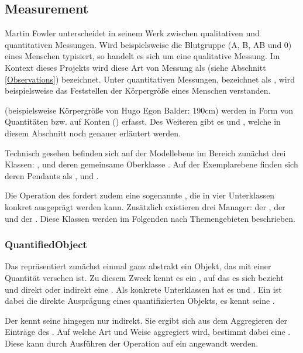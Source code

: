 \subsection{Measurement}
Martin Fowler unterscheidet in seinem Werk  zwischen qualitativen und quantitativen
Messungen. Wird beispielsweise die Blutgruppe (A, B, AB und 0) eines Menschen typisiert, so handelt es sich um
eine qualitative Messung. Im Kontext dieses Projekts wird diese Art von Messung als  (siehe Abschnitt
\ref{Observations}) bezeichnet. Unter quantitativen Messungen, bezeichnet als , wird
beispielsweise das Feststellen der Körpergröße eines Menschen verstanden.

 (beispielsweise Körpergröße von Hugo Egon Balder: 190cm) werden in Form von Quantitäten bzw.
 auf Konten () erfasst. Des Weiteren gibt es  und
, welche in diesem Abschnitt noch genauer erläutert werden.

Technisch gesehen befinden sich auf der Modellebene im Bereich  zunächst drei Klassen:
,  und deren gemeinsame Oberklasse . Auf der
Exemplarebene finden sich deren Pendants als ,  und .

Die Operation  des  fordert zudem eine sogenannte ,
die in vier Unterklassen konkret ausgeprägt werden kann.
Zusätzlich existieren drei Manager: der , der  und der
. Diese Klassen werden im Folgenden nach Themengebieten beschrieben.


\subsubsection{QuantifiedObject}
Das  repräsentiert zunächst einmal ganz abstrakt ein Objekt, das mit einer Quantität versehen
ist. Zu diesem Zweck kennt es ein , auf das es sich bezieht und direkt oder indirekt eine .
Als konkrete Unterklassen hat es  und . Ein  ist dabei die
direkte Ausprägung eines quantifizierten Objekts, es kennt seine . 

Der  kennt seine  hingegen nur indirekt. Sie ergibt sich aus dem Aggregieren der Einträge
 des . Auf welche Art und Weise aggregiert wird, bestimmt dabei eine
. Diese kann durch Ausführen der Operation  auf ein 
angewandt werden.

